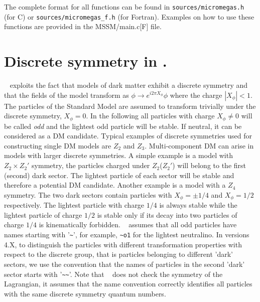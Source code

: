 \documentclass[12pt,a4paper]{article}
\begin{document}
The complete format  for all functions can be found in
\verb|sources/micromegas.h| (for C) or
\verb|sources/micromegas_f.h| (for Fortran). Examples on how to use these functions are provided   
in the MSSM/main.c[F] file. 
 
\section{Discrete symmetry in \micro.}

 \micro~ exploits the fact that models of dark matter exhibit a discrete symmetry
and that the fields  of the model transform as 
$   \phi \to e^{i2\pi X_{\phi}} \phi$
where the charge $|X_{\phi}|<1$. 
The particles of the  Standard Model 
are assumed to transform trivially under the discrete symmetry, $X_\phi=0$. In the following all particles with
 charge $X_\phi\neq 0$  will be called 
 {\it odd} and the  lightest odd particle  will be  stable. If neutral, it can be considered as a DM candidate.
Typical  examples  of discrete symmetries used for constructing single DM models  are $Z_2$ and  $Z_3$. 
Multi-component DM can arise in models with larger discrete symmetries. A simple 
example is a model with  $Z_2\times Z_2'$ symmetry, the particles charged under  $Z_2$($Z_2'$) will belong to the first (second) dark sector. The lightest particle of each sector  will be stable and therefore a potential DM candidate. 
Another example is a model with a $Z_4$  symmetry.  The two dark sectors contain particles with $X_\phi=\pm 1/4$ and $X_\phi=1/2$ respectively. The lightest particle with  charge $1/4$ is always stable while the lightest particle of charge $1/2$ is stable only if its decay into two particles of charge $1/4$ is kinematically forbidden.
 \micro~ assumes that all odd particles have  names
starting with '\verb|~|', for example, \verb|~o1| for the lightest  
neutralino. In versions 4.X, to distinguish the particles with different transformation properties with 
respect to the discrete group, that is particles belonging to different 'dark' sectors,
we use the convention that the names of particles in the second 'dark' sector starts with '\verb|~~|'. 
Note that \micro~ does not check the symmetry of the Lagrangian, it assumes that the name convention 
correctly identifies  all particles with the same discrete symmetry quantum numbers.

  
\end{document}
